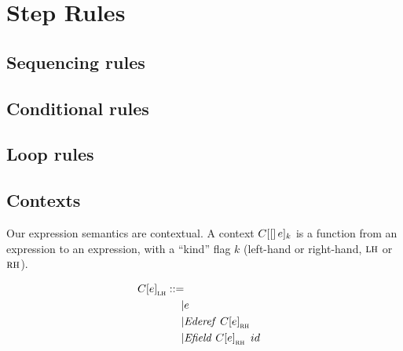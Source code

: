 \documentclass{llncs}
\begin{document}
\section{Step Rules}
\label{app:rules}

\subsection{Sequencing rules}

\sequencing

\subsection{Conditional rules}

\conditionals

\subsection{Loop rules}

\loops

\subsection{Contexts}
\label{app:contexts}

Our expression semantics are contextual. A context \(C \!\left[[\right]e]_k\) is a function from an
expression to an expression, with a ``kind'' flag \(k\) (left-hand or right-hand, \(\textnormal{\sc lh}\) or \(\textnormal{\sc rh}\)).

\[\begin{aligned}
\ctx{\expr}_\lh ::= \\
| & \expr & \\ %
| & \deref{\ctx{\expr}_\rh} \\ %
| & \field{\ctx{\expr}_\rh}{id} \\ %
\end{aligned}\]
\end{document}
